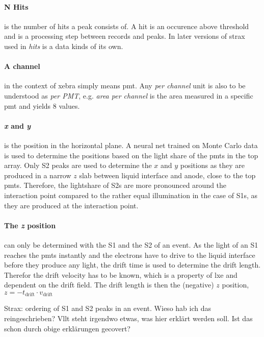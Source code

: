 \paragraph{N Hits} is the number of hits a peak consists of.
A hit is an occurence above threshold and is a processing step between records and peaks.
In later versions of strax used in \nton \emph{hits} is a data kinds of its own.

\paragraph{A channel} in the context of \gls{xebra} simply means \gls{pmt}.
Any \emph{per channel} unit is also to be understood as \emph{per PMT}, e.g. \emph{area per channel} is the area measured in a specific \gls{pmt} and yields 8 values.

\paragraph{\emph{x} and \emph{y}} is the position in the horizontal plane.
A neural net trained on Monte Carlo data is used to determine the positions based on the light share of the \gls{pmt}s in the top array.  %
Only S2 peaks are used to determine the $ x $ and $ y $ positions as they are produced in a narrow $ z $ slab between liquid interface and anode, close to the top \gls{pmt}s.
Therefore, the lightshare of S2s are more pronounced around the interaction point compared to the rather equal illumination in the case of S1s, as they are produced at the interaction point.


\paragraph{The \emph{z} position} can only be determined with the S1 and the S2 of an event.
As the light of an S1 reaches the \gls{pmt}s instantly and the electrons have to drive to the liquid interface before they produce any light, the drift time is used to determine the drift length.
Therefor the drift velocity has to be known, which is a property of \gls{lxe} and dependent on the drift field.
The drift length is then the (negative) $ z $ position, $ z = -t_\mathrm{drift} \cdot v_\mathrm{drift}  $





Strax: ordering of S1 and S2 peaks in an event. Wieso hab ich das reingeschrieben? Vllt steht irgendwo etwas, was hier erklärt werden soll. Ist das schon durch obige erklärungen gecovert?

